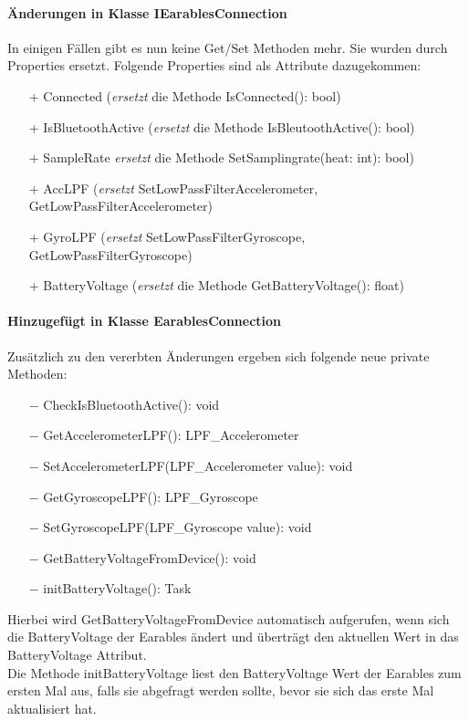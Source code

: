 \documentclass[a4paper,12pt]{article}
\begin{document}
\paragraph{Änderungen in Klasse IEarablesConnection}
In einigen Fällen gibt es nun keine Get/Set Methoden mehr. Sie wurden durch Properties ersetzt.
Folgende Properties sind als Attribute dazugekommen:
\begin{itemize}
	\item[+] Connected (\textit{ersetzt } die Methode IsConnected(): bool)
	\item[+] IsBluetoothActive  (\textit{ersetzt } die Methode IsBleutoothActive(): bool)
	\item[+] SampleRate  \textit{ersetzt } die Methode SetSamplingrate(heat: int): bool)
	\item[+] AccLPF  (\textit{ersetzt} SetLowPassFilterAccelerometer, GetLowPassFilterAccelerometer)
	\item[+] GyroLPF  (\textit{ersetzt} SetLowPassFilterGyroscope, GetLowPassFilterGyroscope)
	\item[+] BatteryVoltage  (\textit{ersetzt } die Methode GetBatteryVoltage(): float)
\end{itemize}

\paragraph{Hinzugefügt in Klasse EarablesConnection}
Zusätzlich zu den vererbten Änderungen ergeben sich folgende neue private Methoden:
\begin{itemize}
	\item[$-$] CheckIsBluetoothActive(): void
	\item[$-$] GetAccelerometerLPF(): LPF\_Accelerometer
	\item[$-$] SetAccelerometerLPF(LPF\_Accelerometer value): void
	\item[$-$] GetGyroscopeLPF(): LPF\_Gyroscope
	\item[$-$] SetGyroscopeLPF(LPF\_Gyroscope value): void
	\item[$-$] GetBatteryVoltageFromDevice(): void
	\item[$-$] initBatteryVoltage(): Task
\end{itemize}
  Hierbei wird GetBatteryVoltageFromDevice automatisch aufgerufen, wenn sich die BatteryVoltage der Earables ändert und überträgt den aktuellen Wert in das BatteryVoltage Attribut.\\
  Die Methode initBatteryVoltage liest den BatteryVoltage Wert der Earables zum ersten Mal aus, falls sie abgefragt werden sollte, bevor sie sich das erste Mal aktualisiert hat.
\end{document}
